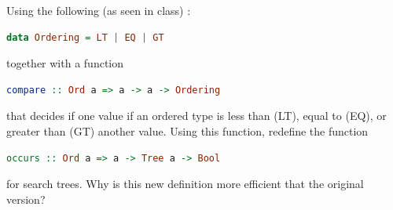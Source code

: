 \documentclass{article}
\begin{document}
\begin{exercise}
Using the following (as seen in class) : 
\begin{lstlisting}[language=Haskell]
data Ordering = LT | EQ | GT
\end{lstlisting}
together with a function 
\begin{lstlisting}[language=Haskell]
compare :: Ord a => a -> a -> Ordering
\end{lstlisting}
that decides if one value if an ordered type is less than (LT), equal to (EQ), or greater than (GT) another value. Using this function, redefine the function 
\begin{lstlisting}[language=Haskell]
occurs :: Ord a => a -> Tree a -> Bool 
\end{lstlisting}
for search trees. Why is this new definition more efficient that the original version? 
\end{exercise}
\end{document}

